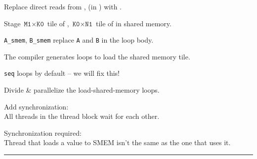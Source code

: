 \newpage
{}

{\large

}

{\LARGE
Replace direct reads from ,  (in ) with .

}

\newpage
{}

{\large

}

{\LARGE
Stage $\texttt{M1} \times \texttt{K0}$ tile of , $\texttt{K0} \times \texttt{N1}$ tile of  in shared memory.

\texttt{A\_smem}, \texttt{B\_smem} replace \texttt{A} and \texttt{B} in the loop body.

}

\newpage
{}

{\large

}

{\LARGE
The compiler generates loops to load the shared memory tile.

\texttt{seq} loops by default -- we will fix this!

}

\newpage
{}

{\large

}

{\LARGE
Divide \& parallelize the load-shared-memory loops.
}

\newpage
{}

{\large

}

{\LARGE
Add synchronization:\\
All threads in the thread block wait for each other.
}

\newpage
{}

{\LARGE
Synchronization required:\\
Thread that loads a value to SMEM isn't the same as the one that uses it.

}

\vfill
\hrule
\vfill

\begin{center}
\Large
\begin{tikzpicture}[node distance=0mm]

\end{tikzpicture}
\end{center}

